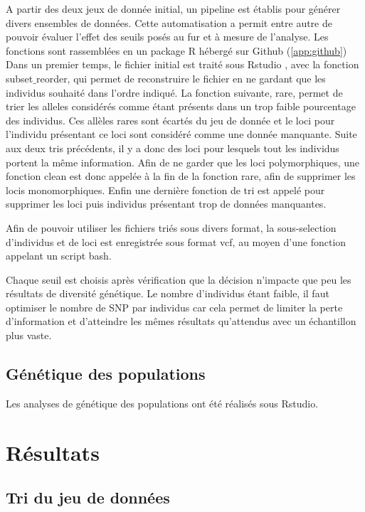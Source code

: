 \documentclass[12pt,a4paper,notitlepage]{article}
\begin{document}
A partir des deux jeux de donnée initial, un pipeline est établis pour générer divers ensembles de données. Cette automatisation a permit entre autre de pouvoir évaluer l'effet des seuils posés au fur et à mesure de l'analyse. Les fonctions sont rassemblées en un package R hébergé sur Github (\autoref{app:github})
Dans un premier temps, le fichier initial est traité sous Rstudio \citep{RTeam2017}, avec la fonction subset$\_$reorder, qui permet de reconstruire le fichier en ne gardant que les individus souhaité dans l'ordre indiqué. La fonction suivante, rare, permet de trier les alleles considérés comme étant présents dans un trop faible pourcentage des individus. Ces allèles rares sont écartés du jeu de donnée et le loci pour l'individu présentant ce loci sont considéré comme une donnée manquante. Suite aux deux tris précédents, il y a donc des loci pour lesquels tout les individus portent la même information. Afin de ne garder que les loci polymorphiques, une fonction clean est donc appelée à la fin de la fonction rare, afin de supprimer les locis monomorphiques.
Enfin une dernière fonction de tri est appelé pour supprimer les loci puis individus présentant trop de données manquantes.

Afin de pouvoir utiliser les fichiers triés sous divers format, la sous-selection d'individus et de loci est enregistrée sous format vcf, au moyen d'une fonction appelant un script bash.


Chaque seuil est choisis après vérification que la décision n'impacte que peu les résultats de diversité génétique.
Le nombre d'individus étant faible, il faut optimiser le nombre de SNP par individus car cela permet de limiter la perte d'information et d'atteindre les mêmes résultats qu'attendus avec un échantillon plus vaste. \citep{Nazareno2017}

\subsection{Génétique des populations}

Les analyses de génétique des populations ont été réalisés sous Rstudio.\citep{RTeam2017}

\section{Résultats}

\subsection{Tri du jeu de données}
\end{document}

